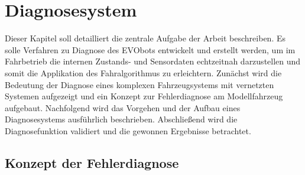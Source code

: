 \chapter{Diagnosesystem} \label{cha:Diagnosesystem}

Dieser Kapitel soll detailliert die zentrale Aufgabe der Arbeit beschreiben. Es solle Verfahren zu Diagnose des EVObots entwickelt und erstellt werden, um im Fahrbetrieb die internen Zustands- und Sensordaten echtzeitnah darzustellen und somit die Applikation des Fahralgorithmus zu erleichtern. 
Zunächst wird die Bedeutung der Diagnose eines komplexen Fahrzeugsystems mit vernetzten Systemen aufgezeigt und ein Konzept zur Fehlerdiagnose am Modellfahrzeug aufgebaut. Nachfolgend wird das Vorgehen und der Aufbau eines Diagnosesystems ausführlich beschrieben. Abschließend wird die Diagnosefunktion validiert und die gewonnen Ergebnisse betrachtet. 

\section{Konzept der Fehlerdiagnose} \label{sec:KonzeptDiagnose} %

